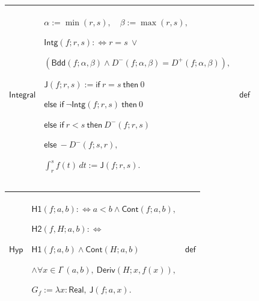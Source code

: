 \documentclass[11pt]{amsart}
\newlength{\FTCThreeColumnBody}
\begin{document}
{\par\setlength{\parskip}{0pt}\nointerlineskip
\noindent
\begin{tabular}{|@{}>{\centering\arraybackslash}m{0.251968\FTCThreeColumnBody}|>{\centering\arraybackslash}m{0.590551\FTCThreeColumnBody}|>{\centering\arraybackslash}m{0.157480\FTCThreeColumnBody}|}\hline
\hypertarget{def:Integral}{$\displaystyle \textsf{Integral}$} & $\displaystyle \alpha:=\min(r,s),\quad\beta:=\max(r,s),$\par
$\displaystyle \textsf{Intg}(f;r,s):\Longleftrightarrow r=s\ \lor$\par
$\displaystyle (\textsf{Bdd}(f;\alpha,\beta)\land D^-(f;\alpha,\beta)=D^+(f;\alpha,\beta)),$\par
$\displaystyle \textsf{J}(f;r,s):=\textsf{if}\ r=s\ \textsf{then}\ 0$\par
$\displaystyle \textsf{else\ if}\ \neg\textsf{Intg}(f;r,s)\ \textsf{then}\ 0$\par
$\displaystyle \textsf{else\ if}\ r<s\ \textsf{then}\ D^-(f;r,s)$\par
$\displaystyle \textsf{else}\ -D^-(f;s,r),$\par
$\displaystyle \int_r^s f(t)\,dt:=\textsf{J}(f;r,s).$ & $\displaystyle \textsf{def}$\\ \hline
\end{tabular}%
\par\setlength{\parskip}{0pt}\nointerlineskip
\noindent
\begin{tabular}{|@{}>{\centering\arraybackslash}m{0.251968\FTCThreeColumnBody}|>{\centering\arraybackslash}m{0.590551\FTCThreeColumnBody}|>{\centering\arraybackslash}m{0.157480\FTCThreeColumnBody}|}\hline
\hypertarget{def:Hyp}{$\displaystyle \textsf{Hyp}$} & $\displaystyle \textsf{H1}(f;a,b):\Longleftrightarrow a<b\land\textsf{Cont}(f;a,b),$\par
$\displaystyle \textsf{H2}(f,H;a,b):\Longleftrightarrow$\par
$\displaystyle \textsf{H1}(f;a,b)\land\textsf{Cont}(H;a,b)$\par
$\displaystyle \land\forall x\in I^\circ(a,b),\ \textsf{Deriv}(H;x,f(x)),$\par
$\displaystyle G_f:=\lambda x:\textsf{Real},\ \textsf{J}(f;a,x).$ & $\displaystyle \textsf{def}$\\ \hline
\end{tabular}%
\par
}
\end{document}
